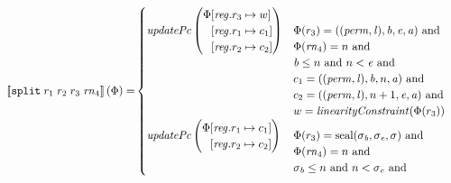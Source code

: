 \documentclass[a4paper]{article}
\begin{document}
\begin{align*}
  \sem{\tsplit{r_1}{r_2}{r_3}{\rn_4}}(\Phi) = &
                               \begin{cases}
                                 \updPcAddr{}\left(
                                   \arraycolsep=0pt
                                   \begin{array}{rl}
                                     \Phi&\updReg{r_3}{w}\\
                                         &\updReg{r_1}{c_1}\\
                                         &\updReg{r_2}{c_2}
                                   \end{array}\right)
&
                                 \arraycolsep=0pt
                                 \begin{array}[t]{l}
                                   \Phi(r_3) = ((\perm,\lin),\baddr,\eaddr,\aaddr) \tand \\
                                   \Phi(\rn_4) = n \tand\\
                                   \baddr \leq n \tand n < \eaddr \tand \\
                                   c_1 = ((\perm,\lin),\baddr,n,\aaddr) \tand \\
                                   c_2 = ((\perm,\lin),n+1,\eaddr,\aaddr) \tand \\
                                   w = \linCons{\Phi(r_3)}
                                 \end{array}\\
                                 \updPcAddr{} \left(
                                 \arraycolsep=0pt
                                 \begin{array}{rl}
                                   \Phi&\updReg{r_1}{c_1}\\
                                       &\updReg{r_2}{c_2}
                                 \end{array} \right)
&
                                 \arraycolsep=0pt
                                 \begin{array}[t]{l}
                                   \Phi(r_3) = \seal{\sigma_\baddr,\sigma_\eaddr,\sigma} \tand \\
                                   \Phi(\rn_4) = n \tand\\
                                   \sigma_\baddr \leq n \tand n < \sigma_\eaddr \tand \\

\end{array}
\end{cases}
\end{align*}
\end{document}
